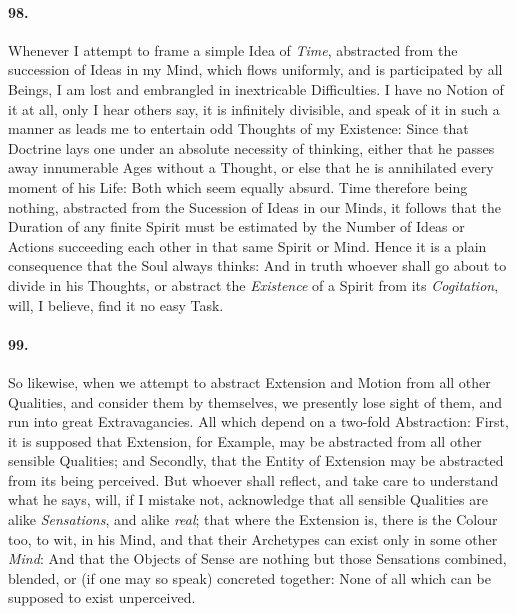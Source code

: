 \documentclass[]{article}
\newenvironment{sectionbody}{\begin{multicols}{2}}{\end{multicols}}
\begin{document}
\begin{sectionbody}
\paragraph{98.} Whenever I attempt to frame a simple Idea of \emph{Time},
abstracted from the succession of Ideas in my Mind, which flows
uniformly, and is participated by all Beings, I am lost and
embrangled in inextricable Difficulties.  I have no Notion of it
at all, only I hear others say, it is infinitely divisible, and
speak of it in such a manner as leads me to entertain odd
Thoughts of my Existence: Since that Doctrine lays one under an
absolute necessity of thinking, either that he passes away
innumerable Ages without a Thought, or else that he is
annihilated every moment of his Life: Both which seem equally
absurd.  Time therefore being nothing, abstracted from the
Sucession of Ideas in our Minds, it follows that the Duration of
any finite Spirit must be estimated by the Number of Ideas or
Actions succeeding each other in that same Spirit or Mind.  Hence
it is a plain consequence that the Soul always thinks: And in
truth whoever shall go about to divide in his Thoughts, or
abstract the \emph{Existence} of a Spirit from its
\emph{Cogitation}, will, I believe, find it no easy Task.



\paragraph{99.} So likewise, when we attempt to abstract Extension and Motion
from all other Qualities, and consider them by themselves, we
presently lose sight of them, and run into great Extravagancies.
All which depend on a two-fold Abstraction: First, it is supposed
that Extension, for Example, may be abstracted from all other
sensible Qualities; and Secondly, that the Entity of Extension
may be abstracted from its being perceived.  But whoever shall
reflect, and take care to understand what he says, will, if I
mistake not, acknowledge that all sensible Qualities are alike
\emph{Sensations}, and alike \emph{real}; that where the
Extension is, there is the Colour too, to wit, in his Mind, and
that their Archetypes can exist only in some other \emph{Mind}:
And that the Objects of Sense are nothing but those Sensations
combined, blended, or (if one may so speak) concreted together:
None of all which can be supposed to exist unperceived.




\end{sectionbody}
\end{document}
